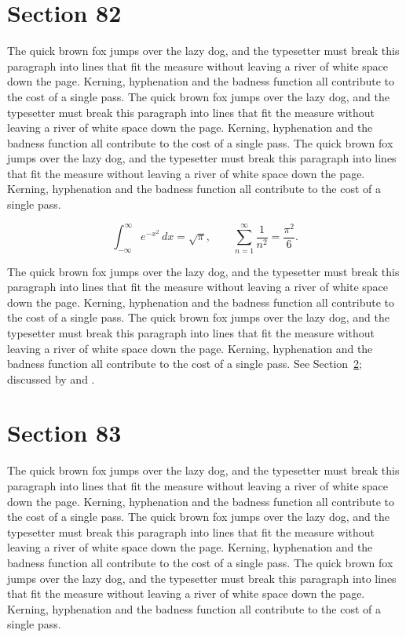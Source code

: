 \documentclass{article}
\begin{document}
\section{Section 82}
\label{sec:82}
The quick brown fox jumps over the lazy dog, and the typesetter must break this paragraph into lines that fit the measure without leaving a river of white space down the page. Kerning, hyphenation and the badness function all contribute to the cost of a single pass. The quick brown fox jumps over the lazy dog, and the typesetter must break this paragraph into lines that fit the measure without leaving a river of white space down the page. Kerning, hyphenation and the badness function all contribute to the cost of a single pass. The quick brown fox jumps over the lazy dog, and the typesetter must break this paragraph into lines that fit the measure without leaving a river of white space down the page. Kerning, hyphenation and the badness function all contribute to the cost of a single pass. 

\begin{equation}\label{eq:82}
\int_{-\infty}^{\infty} e^{-x^{2}}\,dx = \sqrt{\pi}, \qquad
\sum_{n=1}^{\infty} \frac{1}{n^{2}} = \frac{\pi^{2}}{6}.
\end{equation}

The quick brown fox jumps over the lazy dog, and the typesetter must break this paragraph into lines that fit the measure without leaving a river of white space down the page. Kerning, hyphenation and the badness function all contribute to the cost of a single pass. The quick brown fox jumps over the lazy dog, and the typesetter must break this paragraph into lines that fit the measure without leaving a river of white space down the page. Kerning, hyphenation and the badness function all contribute to the cost of a single pass. 
See Section~\ref{sec:83}; discussed by \textcite{k3} and \textcite{l5}.
\section{Section 83}
\label{sec:83}
The quick brown fox jumps over the lazy dog, and the typesetter must break this paragraph into lines that fit the measure without leaving a river of white space down the page. Kerning, hyphenation and the badness function all contribute to the cost of a single pass. The quick brown fox jumps over the lazy dog, and the typesetter must break this paragraph into lines that fit the measure without leaving a river of white space down the page. Kerning, hyphenation and the badness function all contribute to the cost of a single pass. The quick brown fox jumps over the lazy dog, and the typesetter must break this paragraph into lines that fit the measure without leaving a river of white space down the page. Kerning, hyphenation and the badness function all contribute to the cost of a single pass. 
\end{document}
